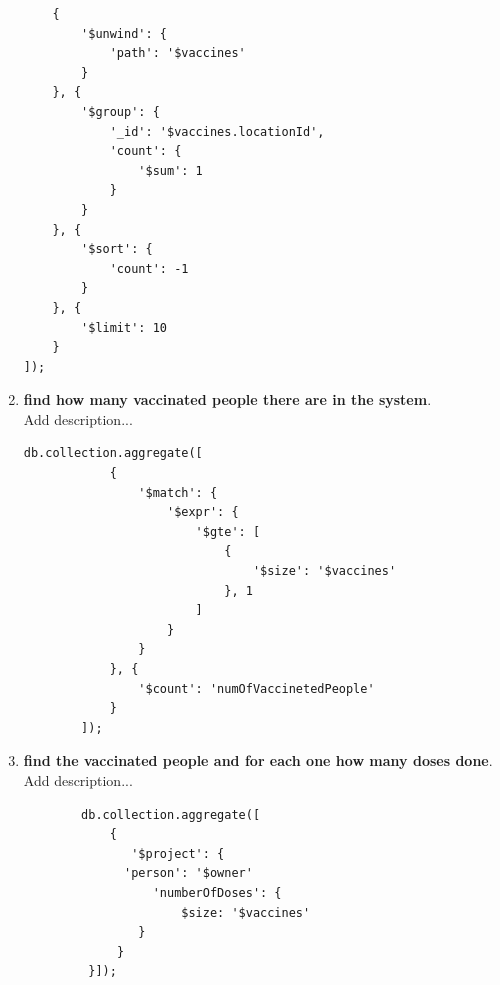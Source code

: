 \documentclass{article}
\begin{document}
\begin{enumerate}
\begin{lstlisting}
    {
        '$unwind': {
            'path': '$vaccines'
        }
    }, {
        '$group': {
            '_id': '$vaccines.locationId', 
            'count': {
                '$sum': 1
            }
        }
    }, {
        '$sort': {
            'count': -1
        }
    }, {
        '$limit': 10
    }
]);
    \end{lstlisting}
    \item \textbf{find how many vaccinated people there are in the system}.\\
    Add description...\\
\begin{lstlisting}
db.collection.aggregate([
            {
                '$match': {
                    '$expr': {
                        '$gte': [
                            {
                                '$size': '$vaccines'
                            }, 1
                        ]
                    }
                }
            }, {
                '$count': 'numOfVaccinetedPeople'
            }
        ]);
\end{lstlisting}
    \item \textbf{find the vaccinated people and for each one how many doses done}.\\
    Add description...\\
    \begin{lstlisting}
        db.collection.aggregate([
            {
               '$project': {
              'person': '$owner'
                  'numberOfDoses': {
                      $size: '$vaccines'
                }
             }
         }]); 
    \end{lstlisting}
    \end{enumerate}
\end{document}
